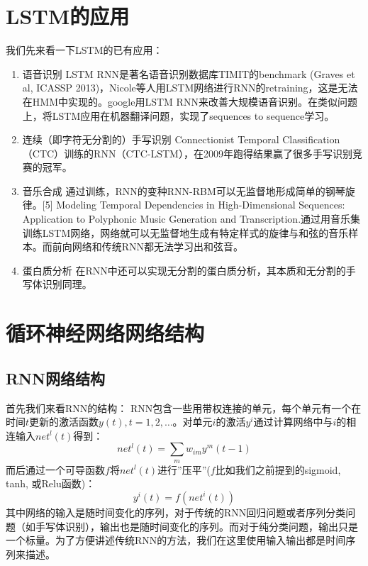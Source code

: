 \section{LSTM的应用}

我们先来看一下LSTM的已有应用：

\begin{enumerate}
\item{语音识别}
LSTM RNN是著名语音识别数据库TIMIT的benchmark (Graves et al, ICASSP 2013)，Nicole等人用LSTM网络进行RNN的retraining\cite{beringer2005classifying}，这是无法在HMM中实现的。google用LSTM RNN来改善大规模语音识别\cite{sak2014long}。在类似问题上，\cite{sutskever2014sequence}将LSTM应用在机器翻译问题，实现了sequences to sequence学习。



\item{连续（即字符无分割的）手写识别}
Connectionist Temporal Classification（CTC）\cite{graves2012connectionist}训练的RNN（CTC-LSTM）\cite{bluche2014a2ia}，在2009年跑得结果赢了很多手写识别竞赛的冠军\cite{graves2006connectionist}。



\item{音乐合成}
通过训练，RNN的变种RNN-RBM可以无监督地形成简单的钢琴旋律。[5] Modeling Temporal Dependencies in High-Dimensional Sequences: Application to Polyphonic Music Generation and Transcription.通过用音乐集训练LSTM网络，网络就可以无监督地生成有特定样式的旋律与和弦的音乐样本。而前向网络和传统RNN都无法学习出和弦音。\cite{eck2002first}



\item{蛋白质分析}
在RNN中还可以实现无分割的蛋白质分析\cite{hochreiter2007fast}，其本质和无分割的手写体识别同理。

\end{enumerate}






\section{循环神经网络网络结构}
\subsection{RNN网络结构}

首先我们来看RNN的结构：
RNN包含一些用带权连接的单元，每个单元有一个在时间$t$更新的激活函数$y(t), t=1,2,…$。对单元$i$的激活$y^{i}$通过计算网络中与$i$的相连输入$net^{l}(t)$得到：
\begin{equation}
	net^{l}(t) = \sum_m{w_{im}y^m(t-1)}
\end{equation}
而后通过一个可导函数$f$将$net^{l}(t)$进行”压平”($f$比如我们之前提到的sigmoid, tanh, 或Relu函数)：
\begin{equation}
	y^{i}(t) = f(net^i(t))
\end{equation}
其中网络的输入是随时间变化的序列，对于传统的RNN回归问题或者序列分类问题（如手写体识别），输出也是随时间变化的序列。而对于纯分类问题，输出只是一个标量。为了方便讲述传统RNN的方法，我们在这里使用输入输出都是时间序列来描述。

